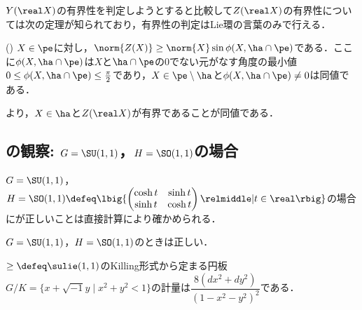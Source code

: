 $Y(\real X) $の有界性を判定しようとすると比較して$Z(\real X) $の有界性については次の定理が知られており，有界性の判定はLie環の言葉のみで行える．

\begin{thm}(\cite[Lemmma~5.4]{kob97})\label{thm:kob97}
  $X\in \pe$に対し，$\norm{Z(X)}\geq \norm{X} \sin\phi(X, \ha\cap\pe)$である．ここに$\phi(X,\ha\cap \pe) $は$X$と$\ha\cap \pe$の0でない元がなす角度の最小値${0\leq \phi(X,\ha\cap \pe) \leq \frac{\pi}{2}} $であり，$X\in \pe\setminus \ha $と$ \phi(X,\ha\cap \pe)\neq 0 $は同値である．
\end{thm}

より，$X\in \ha $と$Z(\real X) $が有界であることが同値である．


\subsection{の観察: $G = \SU(1,1) $，$H = \SO(1,1) $の場合}

$G = \SU(1,1) $，$H = \SO(1,1) \defeq\lbig\{
\begin{pmatrix}
  \cosh t & \sinh t\\ \sinh t & \cosh t
\end{pmatrix}
\relmiddle| t\in \real \rbig\} $の場合にが正しいことは直接計算により確かめられる．

\begin{prop}\label{prop:prob-eg}
  $G = \SU(1,1) $，$H = \SO(1,1) $のときは正しい．
\end{prop}


\begin{lem}\label{lem:riem-metric-su11}
  $\ge\defeq \sulie(1,1)$のKilling形式から定まる{\Poincare}円板${G/K =\{x+\sqrt{-1}y\mid  x^2 + y^2 < 1 \} }$の計量は$ \dfrac{8(dx^2 + dy^2)}{(1 - x^2 - y^2)^2} $である．
\end{lem}


